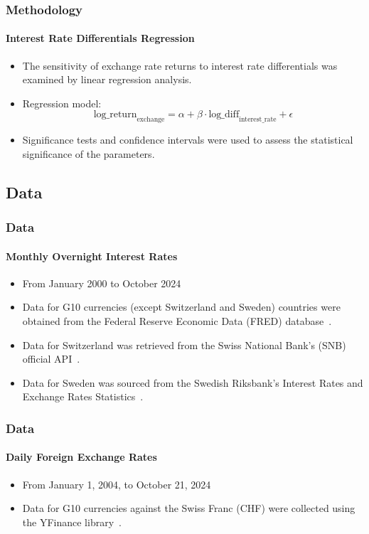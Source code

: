 \documentclass[10pt]{beamer}
\begin{document}
\begin{frame}
\frametitle{Methodology}
\framesubtitle{Interest Rate Differentials Regression}
\begin{itemize}
    \item The sensitivity of exchange rate returns to interest rate differentials was examined by linear regression analysis. 
    \item Regression model: \[
    \text{log\_return}_{\text{exchange}} = \alpha + \beta \cdot \text{log\_diff}_{\text{interest\_rate}} + \epsilon
    \]
    \item Significance tests and confidence intervals were used to assess the statistical significance of the parameters.
\end{itemize}
\end{frame}
\begin{frame}
\section{Data}
\frametitle{Data}
\framesubtitle{Monthly Overnight Interest Rates}
\begin{itemize}
    \item From January 2000 to October 2024
    \item Data for G10 currencies (except Switzerland and Sweden) countries were obtained from the Federal Reserve Economic Data (FRED) database~\cite{fred}.
    \item Data for Switzerland was retrieved from the Swiss National Bank's (SNB) official API~\cite{snb}.
    \item Data for Sweden was sourced from the Swedish Riksbank’s Interest Rates and Exchange Rates Statistics~\cite{riksbank}.
\end{itemize}
\end{frame}
\begin{frame}
\frametitle{Data}
\framesubtitle{Daily Foreign Exchange Rates}
\begin{itemize}
    \item From January 1, 2004, to October 21, 2024
    \item Data for G10 currencies against the Swiss Franc (CHF) were collected using the YFinance library~\cite{yfinance}. 
\end{itemize}
\end{frame}
\end{document}
